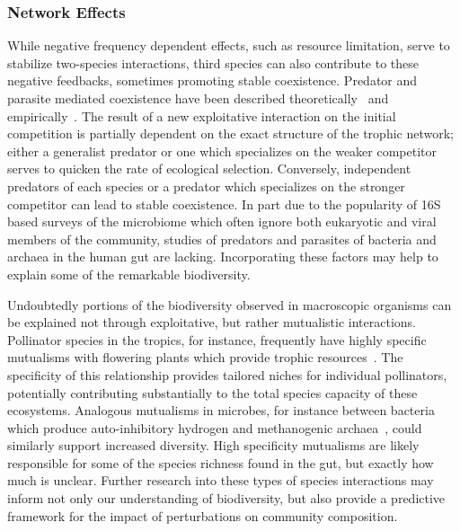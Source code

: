 \documentclass[12pt]{article}
\begin{document}
\subsubsection{Network Effects}
While negative frequency dependent effects,
such as resource limitation,
serve to stabilize two-species interactions,
third species can also contribute to these negative feedbacks,
sometimes promoting stable coexistence.
Predator and parasite mediated coexistence have been described
theoretically~\citep{Caswell1978} and
empirically~\citep{Paine1966,TODO}.
The result of a new exploitative interaction on the initial
competition is partially dependent on the exact structure of the
trophic network;
either a generalist predator or one which specializes on the weaker
competitor serves to quicken the rate of ecological selection.
Conversely, independent predators of each species or a predator
which specializes on the stronger competitor can lead to stable
coexistence.
In part due to the popularity of 16S based surveys of the
microbiome
which often ignore both eukaryotic
and viral members of the community,
studies of predators and parasites of bacteria and archaea
in the human gut are lacking.
Incorporating these factors may help to explain some of the
remarkable biodiversity.

Undoubtedly portions of the biodiversity observed in macroscopic
organisms can be explained not through exploitative,
but rather mutualistic interactions.
Pollinator species in the tropics, for instance, frequently
have highly specific mutualisms with flowering plants which
provide trophic resources~\citep{TODO}.
The specificity of this relationship provides tailored niches
for individual pollinators, potentially contributing substantially
to the total species capacity of these ecosystems.
Analogous mutualisms in microbes, for instance
between bacteria which produce auto-inhibitory hydrogen
and methanogenic archaea~\citep{TODO}, could similarly support increased
diversity.
High specificity mutualisms are likely responsible for some of the species
richness found in the gut,
but exactly how much is unclear.
Further research into these types of species interactions
may inform not only our understanding of biodiversity,
but also provide a predictive framework for the impact of
perturbations on community composition.
\end{document}
